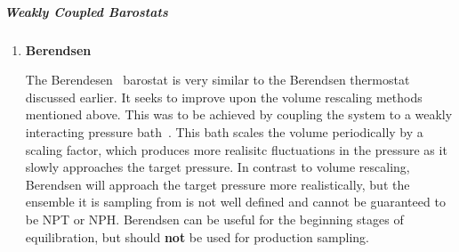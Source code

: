 \documentclass[9pt,bestpractices]{livecoms}
\begin{document}
\subparagraph{Weakly Coupled Barostats}
\begin{enumerate}[listparindent=\parindent]
\item \textbf{Berendsen}

The Berendesen~\cite{berendsen1984molecular} barostat is very similar to the Berendsen thermostat discussed earlier.
It seeks to improve upon the volume rescaling methods mentioned above.
This was to be achieved by coupling the system to a weakly interacting pressure bath~\cite{berendsen1984molecular}.
This bath scales the volume periodically by a scaling factor, which produces more realisitc fluctuations in the pressure as it slowly approaches the target pressure.
In contrast to volume rescaling, Berendsen will approach the target pressure more realistically, but the ensemble it is sampling from is not well defined and cannot be guaranteed to be NPT or NPH\@.
Berendsen can be useful for the beginning stages of equilibration, but should \textbf{not} be used for production sampling.

\end{enumerate}
\end{document}

